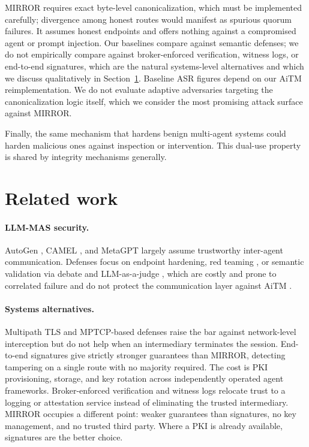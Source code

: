 \documentclass{article}
\begin{document}
MIRROR requires exact byte-level canonicalization, which must be implemented carefully; divergence among honest routes would manifest as spurious quorum failures. It assumes honest endpoints and offers nothing against a compromised agent or prompt injection. Our baselines compare against semantic defenses; we do not empirically compare against broker-enforced verification, witness logs, or end-to-end signatures, which are the natural systems-level alternatives and which we discuss qualitatively in Section~\ref{sec:related}. Baseline ASR figures depend on our AiTM reimplementation. We do not evaluate adaptive adversaries targeting the canonicalization logic itself, which we consider the most promising attack surface against MIRROR.

Finally, the same mechanism that hardens benign multi-agent systems could harden malicious ones against inspection or intervention. This dual-use property is shared by integrity mechanisms generally.

\section{Related work}
\label{sec:related}

\paragraph{LLM-MAS security.}
AutoGen \citep{wu2023autogen}, CAMEL \citep{li2023camel}, and MetaGPT \citep{hong2023metagpt} largely assume trustworthy inter-agent communication. Defenses focus on endpoint hardening, red teaming \citep{perez2022redteaminglanguagemodels}, or semantic validation via debate and LLM-as-a-judge \citep{xiong2023inter, amayuelas2024multiagent}, which are costly and prone to correlated failure \citep{zhang2024breaking} and do not protect the communication layer against AiTM \citep{he2025redteaming}.

\paragraph{Systems alternatives.}
Multipath TLS and MPTCP-based defenses \citep{nguyen2017mptcp} raise the bar against network-level interception but do not help when an intermediary terminates the session. End-to-end signatures give strictly stronger guarantees than MIRROR, detecting tampering on a single route with no majority required. The cost is PKI provisioning, storage, and key rotation across independently operated agent frameworks. Broker-enforced verification and witness logs relocate trust to a logging or attestation service instead of eliminating the trusted intermediary. MIRROR occupies a different point: weaker guarantees than signatures, no key management, and no trusted third party. Where a PKI is already available, signatures are the better choice.
\end{document}
